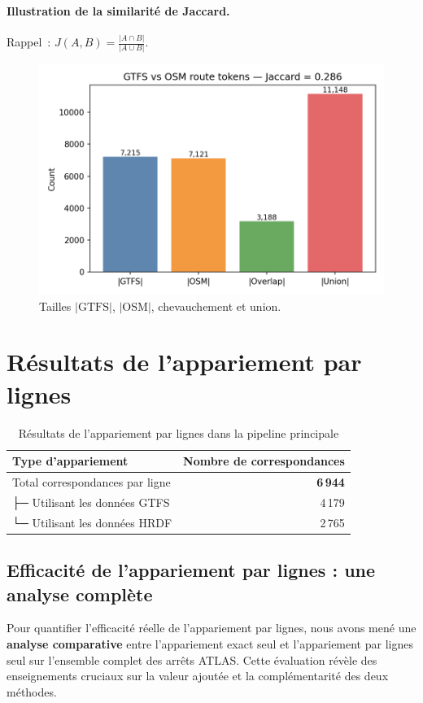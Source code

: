 \paragraph{Illustration de la similarité de Jaccard.} Rappel : \(J(A,B) = \frac{|A \cap B|}{|A \cup B|}\).

\begin{figure}[H]
  \centering
  \includegraphics[width=\textwidth]{../figures/chap4/jaccard_sets_bars.png}
  \caption*{Tailles \(|\mathrm{GTFS}|\), \(|\mathrm{OSM}|\), chevauchement et union.}
\end{figure}

\section{Résultats de l'appariement par lignes}

\begin{table}[H]
\centering
\begin{tabular}{lr}
\toprule
\textbf{Type d'appariement} & \textbf{Nombre de correspondances} \\
\midrule
Total correspondances par ligne & \textbf{6\,944} \\
\quad ├─ Utilisant les données GTFS & 4\,179 \\
\quad └─ Utilisant les données HRDF & 2\,765 \\
\bottomrule
\end{tabular}
\caption{Résultats de l'appariement par lignes dans la pipeline principale}
\label{tab:route_matching_results}
\end{table}

\subsection{Efficacité de l'appariement par lignes : une analyse complète}
Pour quantifier l'efficacité réelle de l'appariement par lignes, nous avons mené une \textbf{analyse comparative} entre l'appariement exact seul et l'appariement par lignes seul sur l'ensemble complet des arrêts ATLAS. Cette évaluation révèle des enseignements cruciaux sur la valeur ajoutée et la complémentarité des deux méthodes.

